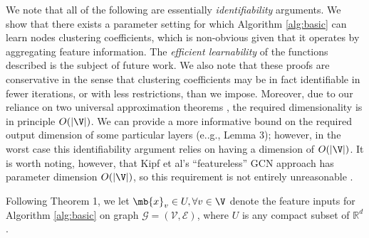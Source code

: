 We note that all of the following are essentially {\em identifiability} arguments. 
We show that there exists a parameter setting for which Algorithm \ref{alg:basic} can learn nodes clustering coefficients, which is non-obvious given that it operates by aggregating feature information.
The {\em efficient learnability} of the functions described is the subject of future work. 
We also note that these proofs are conservative in the sense that clustering coefficients may be in fact identifiable in fewer iterations, or with less restrictions, than we impose. 
Moreover, due to our reliance on two universal approximation theorems \cite{hornik1991approximation,qi2016pointnet}, the required dimensionality is in principle $O(|\V|)$.
We can provide a more informative bound on the required output dimension of some particular layers (e..g., Lemma 3); however, in the worst case this identifiability argument relies on having a dimension of $O(|\V|)$. 
It is worth noting, however,  that Kipf et al's ``featureless'' GCN approach has parameter dimension $O(|\V|)$, so this requirement is not entirely unreasonable \cite{kipf2016semi,kipf2016variational}.

Following Theorem 1, we let $\mb{x}_v \in U, \forall v \in \V$ denote the feature inputs for Algorithm \ref{alg:basic} on graph $\mathcal{G}=(\mathcal{V}, \mathcal{E})$, where $U$ is any compact subset of $\mathbb{R}^d$.

